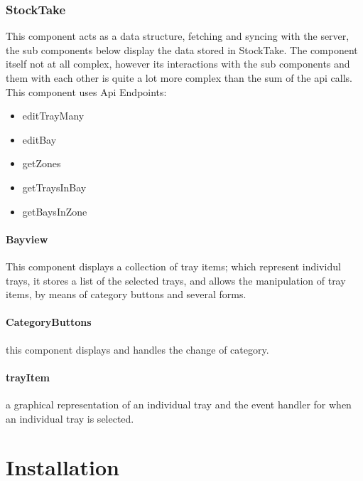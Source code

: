 \documentclass[letterpaper,10pt,english]{sphinxmanual}
\begin{document}
\subsection{StockTake}
\label{\detokenize{docs/System_Overview/Frontend_overview:stocktake}}
This component acts as a data structure, fetching and syncing with the
server, the sub components below display the data stored in StockTake.
The component itself not at all complex, however its interactions with
the sub components and them with each other is quite a lot more complex
than the sum of the api calls. This component uses Api Endpoints:
\begin{itemize}
\item {} 
editTrayMany

\item {} 
editBay

\item {} 
getZones

\item {} 
getTraysInBay

\item {} 
getBaysInZone

\end{itemize}


\subsubsection{Bayview}
\label{\detokenize{docs/System_Overview/Frontend_overview:bayview}}
This component displays a collection of tray items; which represent
individul trays, it stores a list of the selected trays, and allows the
manipulation of tray items, by means of category buttons and several
forms.


\subsubsection{CategoryButtons}
\label{\detokenize{docs/System_Overview/Frontend_overview:categorybuttons}}
this component displays and handles the change of category.


\subsubsection{trayItem}
\label{\detokenize{docs/System_Overview/Frontend_overview:trayitem}}
a graphical representation of an individual tray and the event handler
for when an individual tray is selected.


\chapter{Installation}
\label{\detokenize{index:installation}}
\end{document}
